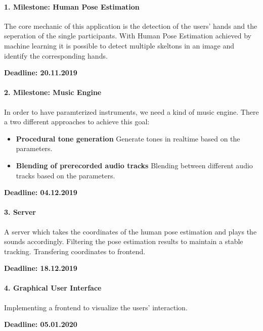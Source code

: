\documentclass[titlepage, a4paper, 11pt]{scrartcl}
\begin{document}
\paragraph{1. Milestone: Human Pose Estimation}

The core mechanic of this application is the detection of the users' hands and the seperation of the single participants.
With Human Pose Estimation achieved by machine learning it is possible to detect multiple skeltons in an image and identify the corresponding hands.
\begin{flushright}
    \textbf{Deadline: 20.11.2019}
\end{flushright}

\paragraph{2. Milestone: Music Engine}

In order to have paramterized instruments, we need a kind of music engine.
There a two different approaches to achieve this goal:
\begin{itemize}
    \item \textbf{Procedural tone generation} Generate tones in realtime based on the parameters.
    \item \textbf{Blending of prerecorded audio tracks} Blending between different audio tracks based on the parameters.
\end{itemize}
\begin{flushright}
    \textbf{Deadline: 04.12.2019}
\end{flushright}

\paragraph{3. Server}

A server which takes the coordinates of the human pose estimation and plays the sounds accordingly.
Filtering the pose estimation results to maintain a stable tracking. Transfering coordinates to frontend.
\begin{flushright}
    \textbf{Deadline: 18.12.2019}
\end{flushright}

\paragraph{4. Graphical User Interface}

Implementing a frontend to visualize the users' interaction.

\begin{flushright}
    \textbf{Deadline: 05.01.2020}
\end{flushright}
\end{document}
